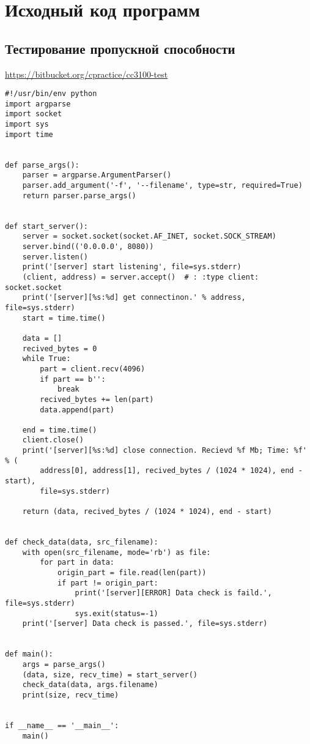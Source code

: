 \chapter{Исходный код программ}
\label{cha:appendix2}



\section{Тестирование пропускной способности}

\url{https://bitbucket.org/cpractice/cc3100-test}

\begin{verbatim}
#!/usr/bin/env python
import argparse
import socket
import sys
import time


def parse_args():
    parser = argparse.ArgumentParser()
    parser.add_argument('-f', '--filename', type=str, required=True)
    return parser.parse_args()


def start_server():
    server = socket.socket(socket.AF_INET, socket.SOCK_STREAM)
    server.bind(('0.0.0.0', 8080))
    server.listen()
    print('[server] start listening', file=sys.stderr)
    (client, address) = server.accept()  # : :type client: socket.socket
    print('[server][%s:%d] get connectinon.' % address, file=sys.stderr)
    start = time.time()

    data = []
    recived_bytes = 0
    while True:
        part = client.recv(4096)
        if part == b'':
            break
        recived_bytes += len(part)
        data.append(part)

    end = time.time()
    client.close()
    print('[server][%s:%d] close connection. Recievd %f Mb; Time: %f' % (
        address[0], address[1], recived_bytes / (1024 * 1024), end - start),
        file=sys.stderr)

    return (data, recived_bytes / (1024 * 1024), end - start)


def check_data(data, src_filename):
    with open(src_filename, mode='rb') as file:
        for part in data:
            origin_part = file.read(len(part))
            if part != origin_part:
                print('[server][ERROR] Data check is faild.', file=sys.stderr)
                sys.exit(status=-1)
    print('[server] Data check is passed.', file=sys.stderr)


def main():
    args = parse_args()
    (data, size, recv_time) = start_server()
    check_data(data, args.filename)
    print(size, recv_time)


if __name__ == '__main__':
    main()
\end{verbatim}


